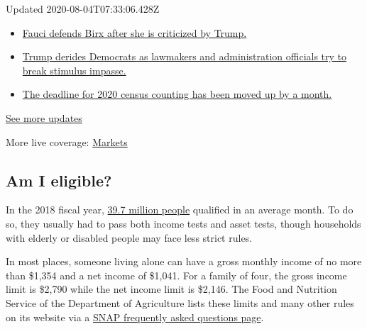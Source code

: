 Updated 2020-08-04T07:33:06.428Z

\begin{itemize}
\tightlist
\item
  \href{https://www.nytimes3xbfgragh.onion/2020/08/03/world/coronavirus-covid-19.html?action=click\&pgtype=Article\&state=default\&region=MAIN_CONTENT_1\&context=storylines_live_updates\#link-4547638f}{Fauci
  defends Birx after she is criticized by Trump.}
\item
  \href{https://www.nytimes3xbfgragh.onion/2020/08/03/world/coronavirus-covid-19.html?action=click\&pgtype=Article\&state=default\&region=MAIN_CONTENT_1\&context=storylines_live_updates\#link-15e7f995}{Trump
  derides Democrats as lawmakers and administration officials try to
  break stimulus impasse.}
\item
  \href{https://www.nytimes3xbfgragh.onion/2020/08/03/world/coronavirus-covid-19.html?action=click\&pgtype=Article\&state=default\&region=MAIN_CONTENT_1\&context=storylines_live_updates\#link-e5a2cda}{The
  deadline for 2020 census counting has been moved up by a month.}
\end{itemize}

\href{https://www.nytimes3xbfgragh.onion/2020/08/03/world/coronavirus-covid-19.html?action=click\&pgtype=Article\&state=default\&region=MAIN_CONTENT_1\&context=storylines_live_updates}{See
more updates}

More live coverage:
\href{https://www.nytimes3xbfgragh.onion/live/2020/08/03/business/stock-market-today-coronavirus?action=click\&pgtype=Article\&state=default\&region=MAIN_CONTENT_1\&context=storylines_live_updates}{Markets}

\hypertarget{am-i-eligible}{%
\subsection{Am I eligible?}\label{am-i-eligible}}

In the 2018 fiscal year,
\href{https://fns-prod.azureedge.net/sites/default/files/resource-files/Characteristics2018-Summary.pdf}{39.7
million people} qualified in an average month. To do so, they usually
had to pass both income tests and asset tests, though households with
elderly or disabled people may face less strict rules.

In most places, someone living alone can have a gross monthly income of
no more than \$1,354 and a net income of \$1,041. For a family of four,
the gross income limit is \$2,790 while the net income limit is \$2,146.
The Food and Nutrition Service of the Department of Agriculture lists
these limits and many other rules on its website via a
\href{https://www.fns.usda.gov/snap/recipient/eligibility}{SNAP
frequently asked questions page}.

